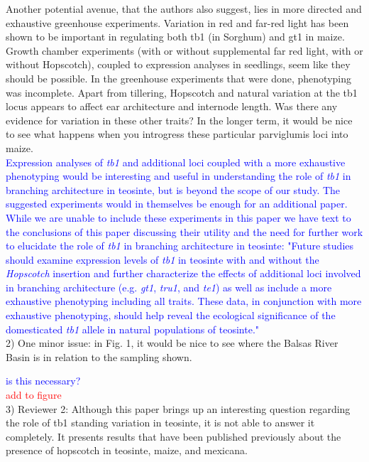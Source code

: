 \documentclass[11pt]{article}
\newcommand{\res}[1]{\noindent \textcolor{blue}{{#1}} \\}
\newcommand{\jri}[1]{\noindent \textcolor{red}{{#1}} \\}
\begin{document}
Another potential avenue, that the authors also suggest, lies in more directed and exhaustive greenhouse experiments. Variation in red and far-red light has been shown to be important in regulating both tb1 (in Sorghum) and gt1 in maize. Growth chamber experiments (with or without supplemental far red light, with or without Hopscotch), coupled to expression analyses in seedlings, seem like they should be possible.  In the greenhouse experiments that were done, phenotyping was incomplete. Apart from tillering, Hopscotch and natural variation at the tb1 locus appears to affect ear architecture and internode length. Was there any evidence for variation in these other traits? In the longer term, it would be nice to see what happens when you introgress these particular parviglumis loci into maize.\\ 

\res{Expression analyses of \emph{tb1} and additional loci coupled with a more exhaustive phenotyping would be interesting and useful in understanding the role of \emph{tb1} in branching architecture in teosinte, but is beyond the scope of our study. The suggested experiments would in themselves be enough for an additional paper. While we are unable to include these experiments in this paper we have text to the conclusions of this paper discussing their utility and the need for further work to elucidate the role of \emph{tb1} in branching architecture in teosinte: "Future studies should examine expression levels of \emph{tb1} in teosinte with and without the \emph{Hopscotch} insertion and further characterize the effects of additional loci involved in branching architecture (e.g. \emph{gt1}, \emph{tru1}, and \emph{te1}) as well as include a more exhaustive phenotyping including all traits.  These data, in conjunction with more exhaustive phenotyping, should help reveal the ecological significance of the domesticated \emph{tb1} allele in natural populations of teosinte."}

2) One minor issue: in Fig. 1, it would be nice to see where the Balsas River Basin is in relation to the sampling shown. 

\res{is this necessary?}
\jri{add to figure}

3) Reviewer 2: Although this paper brings up an interesting question regarding the role of tb1 standing variation in teosinte, it is not able to answer it completely.  It presents results that have been published previously about the presence of hopscotch in teosinte, maize, and mexicana.\\
\end{document}
